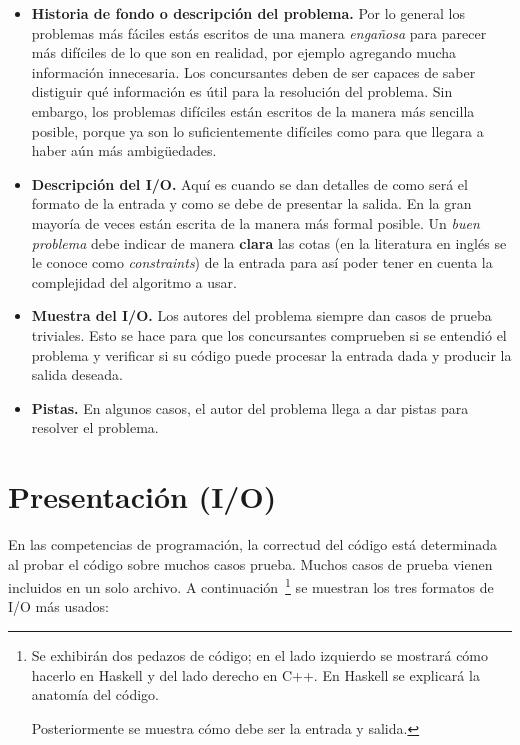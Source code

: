 \begin{itemize}
\item \textbf{Historia de fondo o descripción del problema.} 
Por lo general los problemas más fáciles estás escritos de una manera 
\emph{engañosa} para parecer más difíciles de lo que son en realidad,
por ejemplo agregando mucha información innecesaria. Los concursantes deben de
ser capaces de saber distiguir qué información es útil para la resolución del 
problema. Sin embargo, los problemas difíciles están escritos de la manera más 
sencilla posible, porque ya son lo suficientemente difíciles como para que 
llegara a haber aún más ambigüedades.

\item \textbf{Descripción del I/O.} Aquí es cuando se dan detalles de como será 
el formato de la entrada y como se debe de presentar la salida. En la gran 
mayoría de veces están escrita de la manera más formal posible. Un \emph{buen 
problema} debe indicar de manera \textbf{clara} las cotas (en la literatura en 
inglés se le conoce como \emph{constraints}) de la entrada para así poder
tener en cuenta la complejidad del algoritmo a usar.

\item \textbf{Muestra del I/O.} Los autores del problema siempre dan casos de 
prueba triviales. Esto se hace para que los concursantes comprueben si se 
entendió el problema y verificar si su código puede procesar la entrada dada y 
producir la salida deseada.

\item \textbf{Pistas.} En algunos casos, el autor del problema llega a dar 
pistas para resolver el problema.

\end{itemize}

\section{Presentación (I/O)}

En las competencias de programación, la correctud del código está determinada 
al probar el código sobre muchos casos prueba. Muchos casos de prueba vienen 
incluidos en un solo archivo. A continuación~\footnote{
    Se exhibirán dos pedazos de código; en el lado izquierdo se mostrará cómo 
    hacerlo en Haskell y del lado derecho en C++. 
    En Haskell se explicará la anatomía del código.

    Posteriormente se muestra cómo debe ser la entrada y salida.
} se muestran los tres formatos de I/O más usados:

